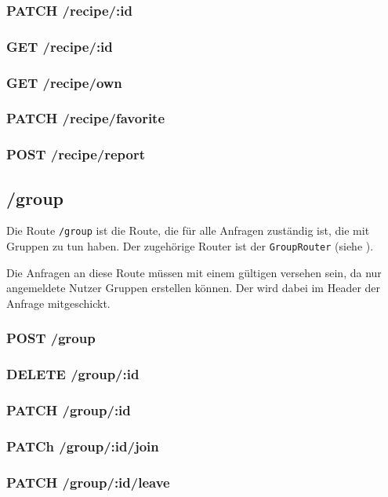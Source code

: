 \documentclass{entwurfsheft}
\begin{document}
\subsubsection*{PATCH /recipe/:id}
\subsubsection*{GET /recipe/:id}
\subsubsection*{GET /recipe/own}
\subsubsection*{PATCH /recipe/favorite}
\subsubsection*{POST /recipe/report}

\subsection{/group}
Die Route \texttt{/group} ist die Route, die für alle Anfragen zuständig ist, die mit Gruppen zu tun haben.
Der zugehörige Router ist der \texttt{GroupRouter} (siehe ).

Die Anfragen an diese Route müssen mit einem gültigen  versehen sein, da nur angemeldete Nutzer Gruppen erstellen können.
Der  wird dabei im Header der Anfrage mitgeschickt.

\subsubsection*{POST /group}

\subsubsection*{DELETE /group/:id}
\subsubsection*{PATCH /group/:id}
\subsubsection*{PATCh /group/:id/join}
\subsubsection*{PATCH /group/:id/leave}
\end{document}
